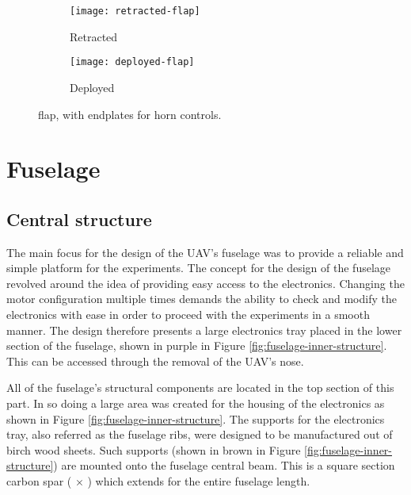\documentclass[../../main.tex]{subfiles}
\begin{document}
\begin{figure}[H]

    \centering
    \begin{subfigure}[b]{0.49\columnwidth}
        \centering
        \texttt{[image: retracted-flap]}
        \caption{Retracted}
        \label{fig:flaps:retracted}
    \end{subfigure}
    \hfill
    \begin{subfigure}[b]{0.49\columnwidth}
        \centering
        \texttt{[image: deployed-flap]}
        \caption{Deployed}
        \label{fig:flaps:deployed}
    \end{subfigure}
    
    \caption{flap, with endplates for horn controls.}
    \label{fig:flaps}
\end{figure}

\section{Fuselage} \label{sec:final-design-proposal:fuselage}

\subsection{Central structure} \label{sec:final-design-proposal:fuselage:central-structure}

The main focus for the design of the UAV's fuselage was to provide a reliable and simple platform for the experiments.
The concept for the design of the fuselage revolved around the idea of providing easy access to the electronics.
Changing the motor configuration multiple times demands the ability to check and modify the electronics with ease in order to proceed with the experiments in a smooth manner.
The design therefore presents a large electronics tray placed in the lower section of the fuselage, shown in purple in Figure \ref{fig:fuselage-inner-structure}.
This can be accessed through the removal of the UAV's nose.


All of the fuselage's structural components are located in the top section of this part.
In so doing a large area was created for the housing of the electronics as shown in Figure \ref{fig:fuselage-inner-structure}.
The supports for the electronics tray, also referred as the fuselage ribs, were designed to be manufactured out of  birch wood sheets.
Such supports (shown in brown in Figure \ref{fig:fuselage-inner-structure}) are mounted onto the fuselage central beam.
This is a square section carbon spar ( $\times$ ) which extends for the entire fuselage length. 
\end{document}
